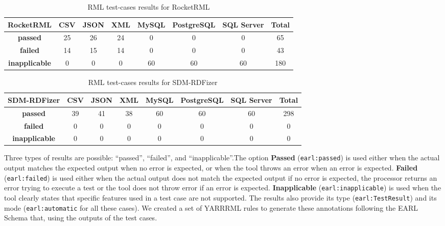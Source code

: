 \begin{table}[]
\centering
\caption{RML test-cases results for RocketRML}
\label{tab:rocketrml}
\begin{tabular}{c|c|c|c|c|c|c|c}

RocketRML                & \textbf{CSV} & \textbf{JSON} & \textbf{XML} & \textbf{MySQL} & \textbf{PostgreSQL} & \textbf{SQL Server} & \textbf{Total} \\ \hline
\textbf{passed}       & 25           & 26          & 24            & 0              & 0                   & 0                   & 65             \\ \hline
\textbf{failed}       & 14           & 15           & 14            & 0              & 0                   & 0                   & 43             \\ \hline
\textbf{inapplicable} & 0            & 0             & 0             & 60             & 60                  & 60                  & 180            \\ 
\end{tabular}
\end{table}


\begin{table}[]
\centering
\caption{RML test-cases results for SDM-RDFizer}
\label{tab:sdm-rdfizer}
\begin{tabular}{c|c|c|c|c|c|c|c}

SDM-RDFizer                & \textbf{CSV} & \textbf{JSON} & \textbf{XML} & \textbf{MySQL} & \textbf{PostgreSQL} & \textbf{SQL Server} & \textbf{Total} \\ \hline
\textbf{passed}       & 39           & 41           & 38            & 60              & 60                   & 60                   & 298             \\ \hline
\textbf{failed}       & 0           & 0           & 0            & 0              & 0                   & 0                   & 0             \\ \hline
\textbf{inapplicable} & 0            & 0             & 0             & 0             & 0                  & 0                  & 0            \\ 
\end{tabular}
\end{table}


Three types of results are possible: ``passed'', ``failed'', and ``inapplicable''.The option \textbf{Passed} (\texttt{earl:passed}) is used either when the actual output matches the expected output when no error is expected, or when the tool throws an error when an error is expected. \textbf{Failed} (\texttt{earl:failed}) is used either when the actual output does not match the expected output if no error is expected, the processor returns an error trying to execute a test or the tool does not throw error if an error is expected. \textbf{Inapplicable} (\texttt{earl:inapplicable}) is used when the tool clearly states that specific features used in a test case are not supported. The results also provide its type (\texttt{earl:TestResult}) and its mode (\texttt{earl:automatic} for all these cases). 
We created a set of YARRRML rules to generate these annotations following the EARL Schema that, using the outputs of the test cases.

